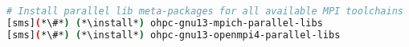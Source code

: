 
\begin{lstlisting}[language=bash,keywords={},upquote=true,keepspaces]
# Install parallel lib meta-packages for all available MPI toolchains
[sms](*\#*) (*\install*) ohpc-gnu13-mpich-parallel-libs
[sms](*\#*) (*\install*) ohpc-gnu13-openmpi4-parallel-libs
\end{lstlisting}
